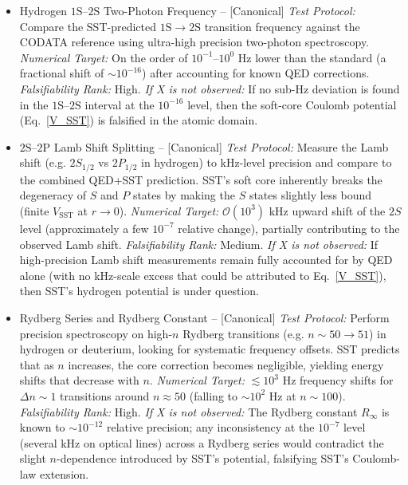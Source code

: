 \documentclass[11pt]{article}
\begin{document}
\begin{itemize}
\item
    Hydrogen $1\mathrm{S}$--$2\mathrm{S}$ Two-Photon Frequency -- [Canonical] \textit{Test Protocol:} Compare the SST-predicted $1\mathrm{S}\to2\mathrm{S}$ transition frequency against the CODATA reference using ultra-high precision two-photon spectroscopy. \textit{Numerical Target:} On the order of $10^{-1}$--$10^0$ Hz lower than the standard (a fractional shift of $\sim10^{-16}$) after accounting for known QED corrections. \textit{Falsifiability Rank:} High. \textit{If X is not observed:} If no sub-Hz deviation is found in the $1\mathrm{S}$--$2\mathrm{S}$ interval at the $10^{-16}$ level, then the soft-core Coulomb potential (Eq.~\ref{V_SST}) is falsified in the atomic domain.

\item
    $2\mathrm{S}$--$2\mathrm{P}$ Lamb Shift Splitting -- [Canonical] \textit{Test Protocol:} Measure the Lamb shift (e.g. $2S_{1/2}$ vs $2P_{1/2}$ in hydrogen) to kHz-level precision and compare to the combined QED+SST prediction. SST's soft core inherently breaks the degeneracy of $S$ and $P$ states by making the $S$ states slightly less bound (finite $V_{\text{SST}}$ at $r\to0$). \textit{Numerical Target:} $\mathcal{O}(10^3)$ kHz upward shift of the $2S$ level (approximately a few $10^{-7}$ relative change), partially contributing to the observed Lamb shift. \textit{Falsifiability Rank:} Medium. \textit{If X is not observed:} If high-precision Lamb shift measurements remain fully accounted for by QED alone (with no kHz-scale excess that could be attributed to Eq.~\ref{V_SST}), then SST's hydrogen potential is under question.

\item
    Rydberg Series and Rydberg Constant -- [Canonical] \textit{Test Protocol:} Perform precision spectroscopy on high-$n$ Rydberg transitions (e.g. $n\sim50\to 51$) in hydrogen or deuterium, looking for systematic frequency offsets. SST predicts that as $n$ increases, the core correction becomes negligible, yielding energy shifts that decrease with $n$. \textit{Numerical Target:} $\lesssim 10^3$ Hz frequency shifts for $\Delta n\sim1$ transitions around $n\approx50$ (falling to $\sim10^2$ Hz at $n\sim100$). \textit{Falsifiability Rank:} High. \textit{If X is not observed:} The Rydberg constant $R_\infty$ is known to $\sim10^{-12}$ relative precision; any inconsistency at the $10^{-7}$ level (several kHz on optical lines) across a Rydberg series would contradict the slight $n$-dependence introduced by SST's potential, falsifying SST's Coulomb-law extension.
\end{itemize}
\end{document}
